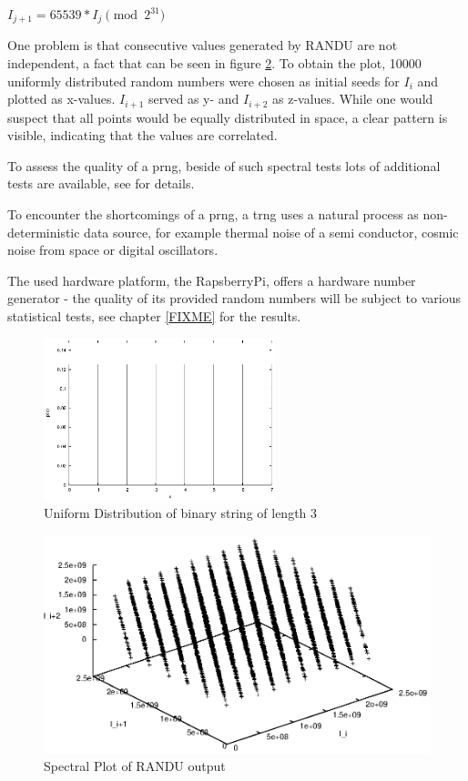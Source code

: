 \begin{center}
 $I_{j+1} = 65539 * I_j \pmod{2^{31}}$
\end{center}

One problem 
is that consecutive values generated by RANDU are not independent, a fact that can be seen in figure \ref{fig:randu}. To obtain the plot, 10000 uniformly distributed 
random numbers were chosen as initial seeds for $I_i$ and plotted as x-values. $I_{i+1}$ served as y- and $I_{i+2}$ as z-values. While one would suspect that all points
would be equally distributed in space, a clear pattern is visible, indicating that the values are correlated.

To assess the quality of a \gls{prng}, beside of such spectral tests lots of additional tests are available, see \cite{nistRAND} for details.

To encounter the shortcomings of a \gls{prng}, a \gls{trng} uses a natural process as non-deterministic data source, for example
thermal noise of a semi conductor, cosmic noise from space or digital oscillators.

The used hardware platform, the RapsberryPi, offers a hardware number generator - the quality of its provided random numbers will be subject
to various statistical tests, see chapter \ref{FIXME} for the results.

\begin{figure}
    \centering
    \includegraphics[width=0.6\textwidth]{figures/uniform}
    \caption{Uniform Distribution of binary string of length 3}
    \label{fig:uniform}
\end{figure}

\begin{figure}
    \centering
    \includegraphics[width=1\textwidth]{figures/randu}
    \caption{Spectral Plot of RANDU output}
    \label{fig:randu}
\end{figure}



